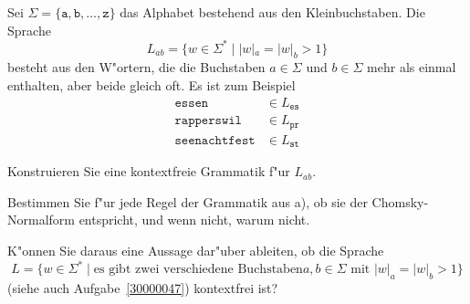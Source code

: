 Sei $\Sigma=\{\texttt{a},\texttt{b},\dots,\texttt{z}\}$ das Alphabet
bestehend aus den Kleinbuchstaben.
Die Sprache
\[
L_{ab}=\{w\in\Sigma^*\;|\; |w|_a=|w|_b>1\}
\]
besteht aus den W"ortern, die die Buchstaben $a\in \Sigma$ und $b\in\Sigma$
mehr als einmal enthalten, aber beide gleich oft.
Es ist zum Beispiel
\begin{align*}
\texttt{essen}&\in L_{\texttt{es}}\\
\texttt{rapperswil}&\in L_{\texttt{pr}}\\
\texttt{seenachtfest}&\in L_{\texttt{st}}
\end{align*}
\begin{teilaufgaben}
\item
Konstruieren Sie eine kontextfreie Grammatik f"ur $L_{ab}$.
\item
Bestimmen Sie f"ur jede Regel der Grammatik aus a), ob sie der
Chomsky-Normalform entspricht, und wenn nicht, warum nicht.
\item
K"onnen Sie daraus eine Aussage dar"uber ableiten, ob die Sprache 
\[
L=\{w\in\Sigma^*\;|\;\text{es gibt zwei verschiedene Buchstaben
$a,b\in\Sigma$ mit $|w|_a=|w|_b > 1$}\}
\]
(siehe auch Aufgabe~\ref{30000047}) kontextfrei ist?
\end{teilaufgaben}

